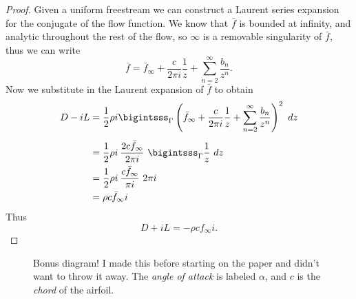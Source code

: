 \documentclass[letterpaper, twoside, 12 pt]{article}
\begin{document}
\begin{proof}
		Given a uniform freestream we can construct a Laurent series expansion for the conjugate of the flow function.
		We know that $\bar f$ is bounded at infinity, and analytic throughout the rest of the flow, so $\infty$ is a removable singularity of $\bar f$, thus we can write
		\[
			\bar f = \bar f_\infty + \frac{c}{2 \pi i} \frac{1}{z} + \sum_{n=2}^\infty \frac{b_n}{z^n}.
		\]
		Now we substitute in the Laurent expansion of $\bar f$ to obtain
		\begin{align*}
			D - iL &= \frac{1}{2} \rho i \bigintsss_\Gamma \left( \bar f_\infty + \frac{c}{2 \pi i} \frac{1}{z} + \sum_{n=2}^\infty \frac{b_n}{z^n} \right)^2 \ dz \\[1 ex]
			&= \frac{1}{2} \rho i \> \frac{2 c \bar f_\infty}{2 \pi i} \ \bigintsss_\Gamma \frac{1}{z} \ dz \\
			&= \frac{1}{2} \rho i \> \frac{c \bar f_\infty}{\pi i} \ 2 \pi i \\
			&= \rho c \bar f_\infty i
		\end{align*}
		Thus
		\[
			D + iL = - \rho c f_\infty i.
		\]
	\end{proof}

\clearpage
\nocite{*}


\clearpage
\begin{figure}[H]
	\centering
	\begin{tikzpicture}
		
	\end{tikzpicture}
	\caption{
		Bonus diagram!
		I made this before starting on the paper and didn't want to throw it away.
		The \textit{angle of attack} is labeled $\alpha$, and $c$ is the \textit{chord} of the airfoil.
	}
\end{figure}
\end{document}
